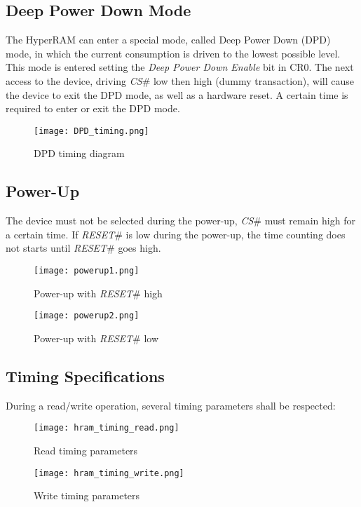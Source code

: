 \documentclass[10pt, english, a4paper, titlepage, oneside]{book}
\begin{document}
\subsection{Deep Power Down Mode}
The HyperRAM can enter a special mode, called Deep Power Down (DPD) mode, in which the current consumption is driven to the lowest possible level. This mode is entered setting the \textit{Deep Power Down Enable} bit in CR0. The next access to the device, driving \textit{CS}\# low then high (dummy transaction), will cause the device to exit the DPD mode, as well as a hardware reset. A certain time is required to enter or exit the DPD mode.
\vspace{4mm}
\begin{figure}[H]
    \centering
    \texttt{[image: DPD\_timing.png]}
    \vspace{3mm}
    \caption{DPD timing diagram}
    \label{DPD_timing}
\end{figure}
\vspace{1mm}
\subsection{Power-Up}
The device must not be selected during the power-up, \textit{CS}\# must remain high for a certain time. If \textit{RESET}\# is low during the power-up, the time counting does not starts until \textit{RESET}\# goes high.
\vspace{4mm}
\begin{figure}[H]
    \centering
    \texttt{[image: powerup1.png]}
    \vspace{3mm}
    \caption{Power-up with \textit{RESET}\# high}
    \label{powerup1}
\end{figure}
\vspace{2mm}
\begin{figure}[H]
    \centering
    \texttt{[image: powerup2.png]}
    \vspace{3mm}
    \caption{Power-up with \textit{RESET}\# low}
    \label{powerup2}
\end{figure}
\vspace{1mm}
\subsection{Timing Specifications}
During a read/write operation, several timing parameters shall be respected:
\vspace{4mm}
\begin{figure}[H]
    \centering
    \texttt{[image: hram\_timing\_read.png]}
    \vspace{1mm}
    \caption{Read timing parameters}
    \label{hram_timing_read}
\end{figure}
\vspace{1mm}
\begin{figure}[H]
    \centering
    \texttt{[image: hram\_timing\_write.png]}
    \vspace{1mm}
    \caption{Write timing parameters}
    \label{hram_timing_write}
\end{figure}
\vspace{2mm}
\end{document}
